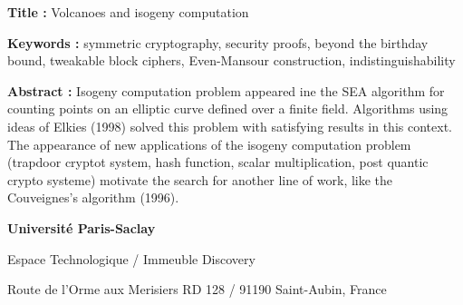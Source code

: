 \documentclass[a4paper, titlepage, 12pt]{book}
\newcommand{\titreeng}{Volcanoes and isogeny computation}
\begin{document}
\begin{breakbox}

\noindent\textbf{Title : }\titreeng

\vspace{2ex}

\noindent\textbf{Keywords : }symmetric cryptography, security proofs, beyond the birthday bound, 
tweakable block ciphers, Even-Mansour construction, indistinguishability

\begin{multicols}{2}
\noindent\textbf{Abstract : }
Isogeny computation problem appeared ine the SEA algorithm for counting points on an elliptic curve defined over a finite field. Algorithms using ideas of Elkies (1998) solved this problem with satisfying results in this context. The appearance of new applications of the isogeny computation problem (trapdoor cryptot system, hash function, scalar multiplication, post quantic crypto systeme) motivate the search for another line of work, like the Couveignes's algorithm (1996).
\end{multicols}
\end{breakbox}


{\tiny
\noindent
\textbf{Université Paris-Saclay}

\noindent
Espace Technologique / Immeuble Discovery

\noindent
Route de l’Orme aux Merisiers RD 128 / 91190 Saint-Aubin, France 

}
\end{document}
